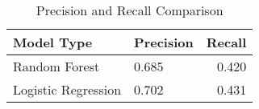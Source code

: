 \begin{table}[ht]
\centering
\begin{tabular}{llr}
  \hline
Model Type & Precision & Recall \\ 
  \hline
Random Forest & 0.685 & 0.420 \\
Logistic Regression & 0.702 & 0.431 \\
   \hline
\end{tabular}
\caption{Precision and Recall Comparison} 
\label{tab:p_r_comp}
\end{table}

